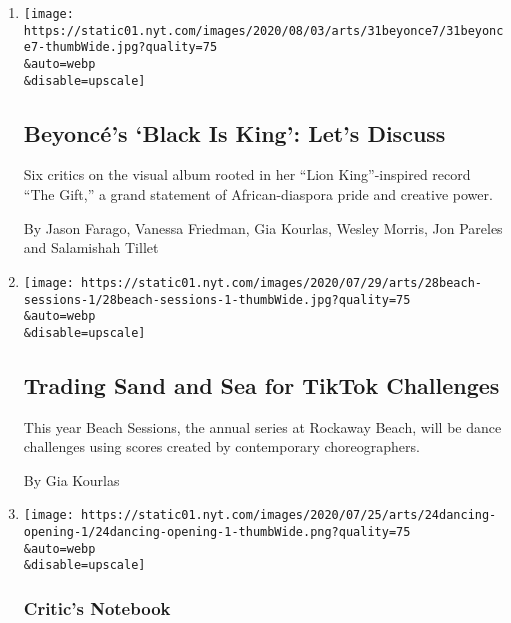 \begin{enumerate}
\def\labelenumi{\arabic{enumi}.}
\item
  \href{/2020/07/31/arts/music/beyonce-black-is-king.html}{}

  \texttt{[image: https://static01.nyt.com/images/2020/08/03/arts/31beyonce7/31beyonce7-thumbWide.jpg?quality=75\\\&auto=webp\\\&disable=upscale]}

  \hypertarget{beyoncuxe9s-black-is-king-lets-discuss}{%
  \subsection{Beyoncé's `Black Is King': Let's
  Discuss}\label{beyoncuxe9s-black-is-king-lets-discuss}}

  Six critics on the visual album rooted in her ``Lion King''-inspired
  record ``The Gift,'' a grand statement of African-diaspora pride and
  creative power.

  By Jason Farago, Vanessa Friedman, Gia Kourlas, Wesley Morris, Jon
  Pareles and Salamishah Tillet
\item
  \href{/2020/07/28/arts/dance/beach-sessions-rockaway-tiktok.html}{}

  \texttt{[image: https://static01.nyt.com/images/2020/07/29/arts/28beach-sessions-1/28beach-sessions-1-thumbWide.jpg?quality=75\\\&auto=webp\\\&disable=upscale]}

  \hypertarget{trading-sand-and-sea-for-tiktok-challenges}{%
  \subsection{Trading Sand and Sea for TikTok
  Challenges}\label{trading-sand-and-sea-for-tiktok-challenges}}

  This year Beach Sessions, the annual series at Rockaway Beach, will be
  dance challenges using scores created by contemporary choreographers.

  By Gia Kourlas
\item
  \href{/2020/07/24/arts/dance/safety-protocols-dance-coronavirus.html}{}

  \texttt{[image: https://static01.nyt.com/images/2020/07/25/arts/24dancing-opening-1/24dancing-opening-1-thumbWide.png?quality=75\\\&auto=webp\\\&disable=upscale]}

  \hypertarget{critics-notebook}{%
  \subsubsection{Critic's Notebook}\label{critics-notebook}}


\end{enumerate}
